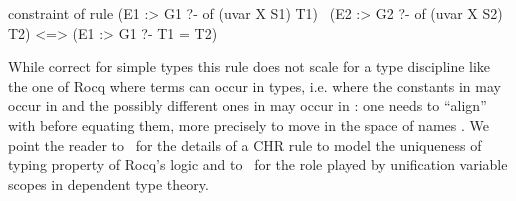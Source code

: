 \documentclass[a4paper, 11pt]{book}
\begin{document}
\begin{elpicode}
constraint of {
  rule (E1 :> G1 ?- of (uvar X S1) T1)
     \ (E2 :> G2 ?- of (uvar X S2) T2)
   <=> (E1 :> G1 ?- T1 = T2)
}
\end{elpicode}

While correct for simple types this rule does not scale for a type
discipline like the one of Rocq where terms can occur in types,
i.e. where the constants in  may occur in  and
the possibly different ones in  may occur in : one needs
to ``align''  with  before equating them, more precisely
to move  in the space of names .
We point the reader to~\cite{TASSI_2019} for the details of
a CHR rule to model the uniqueness of typing property
of Rocq's logic and to~\cite{Jojgov} for the role played by
unification variable scopes in dependent type theory.









\end{document}

